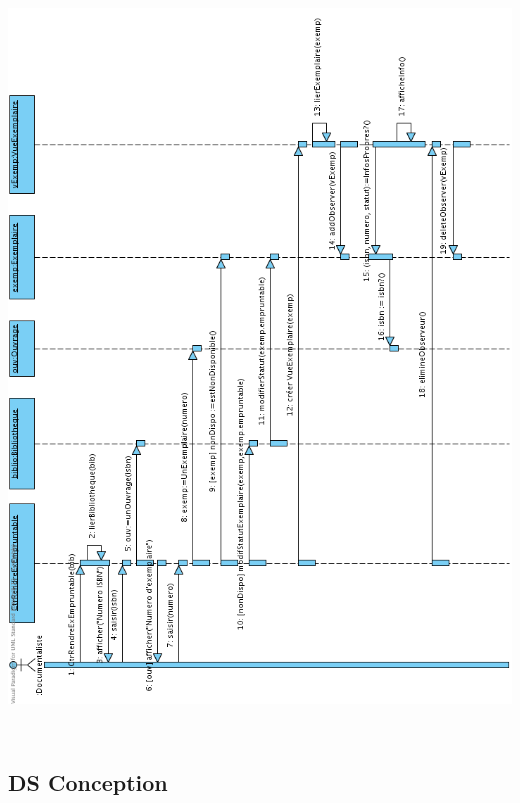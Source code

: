 \documentclass[a4paper,10pt]{report}
\begin{document}
\bigskip
\includegraphics[height=200mm]{RendreExEmpruntableMVC.png}
\newpage

\subsection*{DS Conception}
\end{document}
